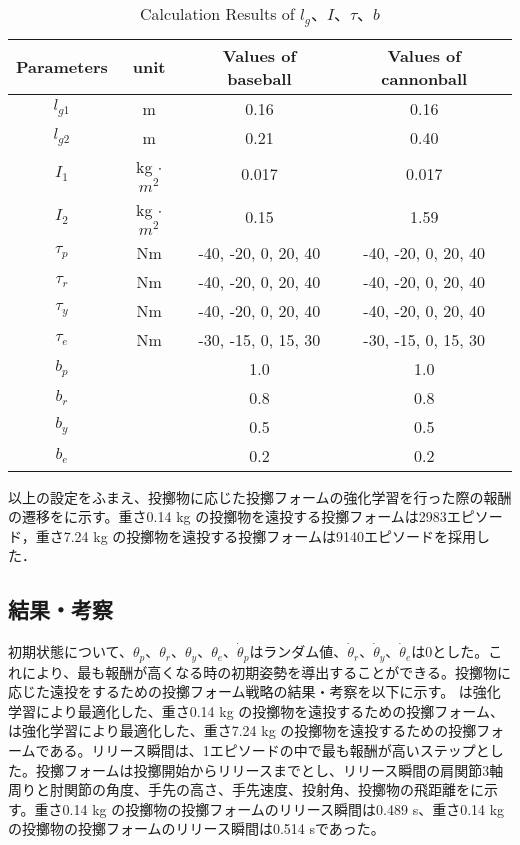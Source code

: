 \begin{table}[tb]
  \begin{center}
    \caption{Calculation Results of $l_{g}$、$I$、$\tau$、$b$}

    \begin{tabular}{c c c c}
      \hline
      Parameters & unit & Values of baseball & Values of cannonball \\
      \hline
      $l_{g1}$ & m & 0.16 & 0.16 \\
      $l_{g2}$ & m & 0.21 & 0.40 \\
      $I_{1}$ & kg $\cdot$ ${m}^2$ & 0.017 & 0.017 \\
      $I_{2}$ & kg $\cdot$ ${m}^2$ & 0.15 & 1.59 \\
      $\tau_{p}$ & Nm & -40, -20, 0, 20, 40 & -40, -20, 0, 20, 40 \\
      $\tau_{r}$ & Nm & -40, -20, 0, 20, 40 & -40, -20, 0, 20, 40 \\
      $\tau_{y}$ & Nm & -40, -20, 0, 20, 40 & -40, -20, 0, 20, 40 \\
      $\tau_{e}$ & Nm & -30, -15, 0, 15, 30 & -30, -15, 0, 15, 30 \\
      $b_{p}$ &  & 1.0 & 1.0\\
      $b_{r}$ &  & 0.8 & 0.8\\
      $b_{y}$ &  & 0.5 & 0.5\\
      $b_{e}$ &  & 0.2 & 0.2\\
      \hline
    \end{tabular}
  \end{center}
\end{table}

以上の設定をふまえ、投擲物に応じた投擲フォームの強化学習を行った際の報酬の遷移をに示す。重さ0.14 kg の投擲物を遠投する投擲フォームは2983エピソード，重さ7.24 kg の投擲物を遠投する投擲フォームは9140エピソードを採用した．


\subsection{結果・考察}
初期状態について、$\theta_{p}$、$\theta_{r}$、$\theta_{y}$、$\theta_{e}$、$\dot{\theta}_{p}$はランダム値、$\dot{\theta}_{r}$、$\dot{\theta}_{y}$、$\dot{\theta}_{e}$は0とした。これにより、最も報酬が高くなる時の初期姿勢を導出することができる。投擲物に応じた遠投をするための投擲フォーム戦略の結果・考察を以下に示す。
は強化学習により最適化した、重さ0.14 kg の投擲物を遠投するための投擲フォーム、は強化学習により最適化した、重さ7.24 kg の投擲物を遠投するための投擲フォームである。リリース瞬間は、1エピソードの中で最も報酬が高いステップとした。投擲フォームは投擲開始からリリースまでとし、リリース瞬間の肩関節3軸周りと肘関節の角度、手先の高さ、手先速度、投射角、投擲物の飛距離をに示す。重さ0.14 kg の投擲物の投擲フォームのリリース瞬間は0.489 s、重さ0.14 kg の投擲物の投擲フォームのリリース瞬間は0.514 sであった。


